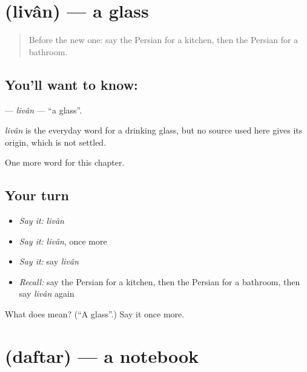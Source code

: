 \section[\texorpdfstring{\fa{لیوان} (livân)}{لیوان (livân)}]{ (livân) — a glass}

\label{lesson:FA-C48-livan}



\begin{quote}
Before the new one: say the Persian for a kitchen, then the Persian for a bathroom.
\end{quote}

\subsection*{You'll want to know: }
\textbf{} — \emph{livân} — \textquotedblleft{}a glass\textquotedblright{}.

\begin{cousinweb}
\emph{livân} is the everyday word for a drinking glass, but no source used here gives its origin, which is not settled.
\end{cousinweb}

\begin{grammarlens}[title={What you've built}]
One more word for this chapter.
\end{grammarlens}

\subsection*{Your turn}
\begin{itemize}
\raggedright
  \item \emph{Say it:} \emph{livân}
  \item \emph{Say it:} \emph{livân}, once more
  \item \emph{Say it:} say \emph{livân}
  \item \emph{Recall:} say the Persian for a kitchen, then the Persian for a bathroom, then say \emph{livân} again
\end{itemize}

\begin{tcolorbox}[breakable,colback=teal!4,colframe=teal!35!black,title={Before you move on}]
What does  mean? (\textquotedblleft{}A glass\textquotedblright{}.) Say it once more.
\end{tcolorbox}
\section[\texorpdfstring{\fa{دفتر} (daftar)}{دفتر (daftar)}]{ (daftar) — a notebook}

